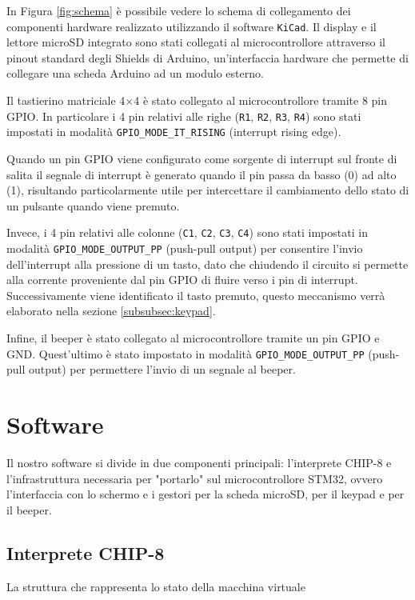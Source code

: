 \documentclass[a4paper]{article}
\begin{document}
In Figura \ref{fig:schema} è possibile vedere lo schema di collegamento
dei componenti hardware realizzato utilizzando il software \texttt{KiCad}.
Il display e il lettore microSD integrato sono stati collegati al microcontrollore
attraverso il pinout standard degli Shields di Arduino, un'interfaccia hardware che permette
di collegare una scheda Arduino ad un modulo esterno.

Il tastierino matriciale 4$\times$4 è stato collegato al microcontrollore tramite 8 pin GPIO.
In particolare i 4 pin relativi alle righe (\texttt{R1}, \texttt{R2}, \texttt{R3}, \texttt{R4})
sono stati impostati in modalità \texttt{GPIO\_MODE\_IT\_RISING} (interrupt rising edge).

Quando un pin GPIO viene configurato come sorgente di interrupt sul fronte di salita
il segnale di interrupt è generato quando il pin passa da basso (0) ad alto (1), risultando
particolarmente utile per intercettare il cambiamento dello stato di un
pulsante quando viene premuto.

Invece, i 4 pin relativi alle colonne (\texttt{C1}, \texttt{C2}, \texttt{C3}, \texttt{C4})
sono stati impostati in modalità \texttt{GPIO\_MODE\_OUTPUT\_PP} (push-pull output) per
consentire l'invio dell'interrupt alla pressione di un tasto, dato che chiudendo il circuito
si permette alla corrente proveniente dal pin GPIO di fluire verso i pin di interrupt.
Successivamente viene identificato il tasto premuto, questo meccanismo verrà elaborato
nella sezione \ref{subsubsec:keypad}.

Infine, il beeper è stato collegato al microcontrollore tramite un pin GPIO e GND.
Quest'ultimo è stato impostato in modalità \texttt{GPIO\_MODE\_OUTPUT\_PP} (push-pull output)
per permettere l'invio di un segnale al beeper.

\section{Software}

Il nostro software si divide in due componenti principali: l'interprete CHIP-8 e
l'infrastruttura necessaria per "portarlo" sul microcontrollore STM32, ovvero l'interfaccia
con lo schermo e i gestori per la scheda microSD, per il keypad e per il beeper.

\subsection{Interprete CHIP-8}

\begin{Listing}[h!t] %
    \centering
    \caption{La struttura che rappresenta lo stato della macchina virtuale}
    \label{chip8_struct}
\end{Listing}
\end{document}
